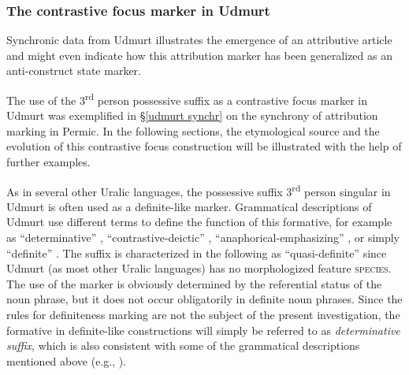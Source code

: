 \subsubsection{The contrastive focus marker in Udmurt} \label{udmurt diachr}
Synchronic data from Udmurt illustrates the emergence of an attributive article and might even indicate how this attribution marker has been generalized as an anti\hyp{}construct state marker. 

The use of the 3\textsuperscript{rd} person possessive suffix as a contrastive focus marker in Udmurt was exemplified in \S\ref{udmurt synchr} on the synchrony of attribution marking in Permic. In the following sections, the etymological source and the evolution of this contrastive focus construction will be illustrated with the help of further examples.

As in several other Uralic languages, the possessive suffix 3\textsuperscript{rd} person singular in Udmurt is often used as a definite-like marker. Grammatical descriptions of Udmurt use different terms to define the function of this formative, for example as “determinative” \citep{kelmakov-etal1999}, “contrastive-deictic” \citep{alatyrev1970}, “anaphorical-emphasizing” \citep{kiekbaev1965}, or simply “definite” \citep{winkler2001}. The suffix is characterized in the following as “quasi-definite” since Udmurt (as most other Uralic languages) has no morphologized feature \textsc{species}. The use of the marker is obviously determined by the referential status of the noun phrase, but it does not occur obligatorily in definite noun phrases. Since the rules for definiteness marking are not the subject of the present investigation, the formative in definite-like constructions will simply be referred to as \textit{determinative suffix}, which is also consistent with some of the grammatical descriptions mentioned above (e.g., \citealt{kelmakov-etal1999}).

